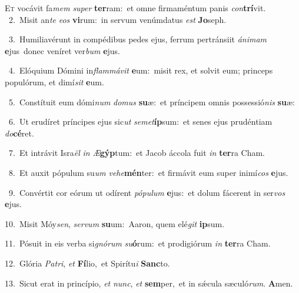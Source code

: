 \lettrine{\initial\textcolor{\initialcolor}{E}}{t} vocávit fa\textit{mem} \textit{su}\-\textit{per} \textbf{ter}\-ram:~\star et omne firmaméntum panis \textit{con}\-\textbf{trí}vit.\\
{\numbfont\textcolor{\numbcolor}{~2.}}~Misit an\textit{te} \textit{e}\-\textit{os} \textbf{vi}\-rum:~\star in servum venúmdatus \textit{est} \textbf{Jo}\-seph.\par
{\numbfont\textcolor{\numbcolor}{~3.}}~Humiliavérunt in compédibus pedes ejus, ferrum pertránsiit \textit{á}\-\textit{ni}\textit{mam} \textbf{e}\-jus~\star donec veníret ver\textit{bum} \textbf{e}\-jus.\par
{\numbfont\textcolor{\numbcolor}{~4.}}~Elóquium Dómini in\-\textit{flam}\-\textit{má}\textit{vit} \textbf{e}\-um:~\star misit rex, et solvit eum; princeps populórum, et dimí\textit{sit} \textbf{e}\-um.\par
{\numbfont\textcolor{\numbcolor}{~5.}}~Constítuit eum dómi\textit{num} \textit{do}\-\textit{mus} \textbf{su}\-æ:~\star et príncipem omnis possessió\textit{nis} \textbf{su}\-æ:\par
{\numbfont\textcolor{\numbcolor}{~6.}}~Ut erudíret príncipes ejus sic\textit{ut} \textit{se}\-\textit{met}\textbf{íp}sum:~\star et senes ejus prudéntiam \textit{do}\-\textbf{cé}ret.\par
{\numbfont\textcolor{\numbcolor}{~7.}}~Et intrávit Isra\textit{ël} \textit{in} \textit{Æ}\-\textbf{gýp}tum:~\star et Jacob áccola fuit \textit{in} \textbf{ter}\-ra Cham.\par
{\numbfont\textcolor{\numbcolor}{~8.}}~Et auxit pópulum su\textit{um} \textit{ve}\-\textit{he}\textbf{mén}ter:~\star et firmávit eum super inimí\textit{cos} \textbf{e}\-jus.\par
{\numbfont\textcolor{\numbcolor}{~9.}}~Convértit cor eórum ut odírent \textit{pó}\-\textit{pu}\textit{lum} \textbf{e}\-jus:~\star et dolum fácerent in ser\textit{vos} \textbf{e}\-jus.\par
{\numbfont\textcolor{\numbcolor}{10.}}~Misit Móy\-\textit{sen}\-, \textit{ser}\-\textit{vum} \textbf{su}\-um:~\star Aaron, quem elé\textit{git} \textbf{ip}\-sum.\par
{\numbfont\textcolor{\numbcolor}{11.}}~Pósuit in eis verba si\-\textit{gnó}\-\textit{rum} \textit{su}\-\textbf{ó}rum:~\star et prodigiórum \textit{in} \textbf{ter}\-ra Cham.\par
{\numbfont\textcolor{\numbcolor}{12.}}~Glória \textit{Pa}\-\textit{tri}, \textit{et} \textbf{Fí}\-lio,~\star et Spirítu\textit{i} \textbf{Sanc}\-to.\par
{\numbfont\textcolor{\numbcolor}{13.}}~Sicut erat in princípio, \textit{et} \textit{nunc}\-, \textit{et} \textbf{sem}\-per,~\star et in sǽcula sæculó\-\textit{rum}\-. \textbf{A}\-men.\par
